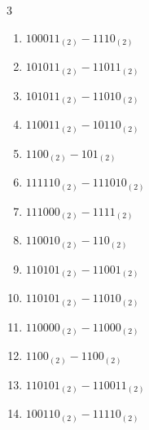 \begin{multicols}{3}
\begin{enumerate}
  \item $100011_{(2)} - 1110_{(2)}$


  \item $101011_{(2)} - 11011_{(2)}$


  \item $101011_{(2)} - 11010_{(2)}$


  \item $110011_{(2)} - 10110_{(2)}$


  \item $1100_{(2)} - 101_{(2)}$


  \item $111110_{(2)} - 111010_{(2)}$


  \item $111000_{(2)} - 1111_{(2)}$


\columnbreak %

  \item $110010_{(2)} - 110_{(2)}$


  \item $110101_{(2)} - 11001_{(2)}$


  \item $110101_{(2)} - 11010_{(2)}$


  \item $110000_{(2)} - 11000_{(2)}$


  \item $1100_{(2)} - 1100_{(2)}$


  \item $110101_{(2)} - 110011_{(2)}$


  \item $100110_{(2)} - 11110_{(2)}$


\end{enumerate}
\end{multicols}
